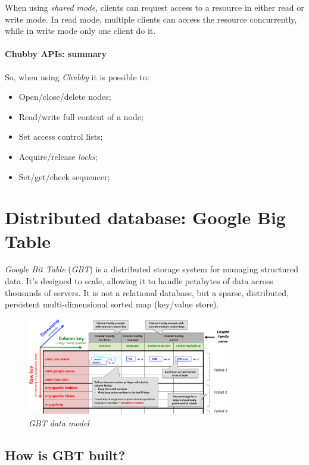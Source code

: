 \noindent
When using \emph{shared mode}, clients can request access to a resource in either
read or write mode. In read mode, multiple clients can access the resource
concurrently, while in write mode only one client do it.

\paragraph{Chubby APIs: summary}
So, when using \emph{Chubby} it is possible to:
\begin{itemize}
    \item Open/close/delete nodes;
    \item Read/write full content of a node;
    \item Set access control lists;
    \item Acquire/release \emph{locks};
    \item Set/get/check sequencer;
\end{itemize}

\section{Distributed database: Google Big Table}
\emph{Google Bit Table} (\emph{GBT}) is a distributed storage system for
managing structured data. It's designed to scale, allowing it to handle petabytes
of data across thousands of servers. It is not a relational database, but a
sparse, distributed, persistent multi-dimensional sorted map (key/value store).

\begin{figure}[h!]
    \centering
    \includegraphics[width=0.8\textwidth]{images/gbt-design.png}
    \caption{\emph{GBT data model}}
\end{figure}

\subsection{How is GBT built?}

